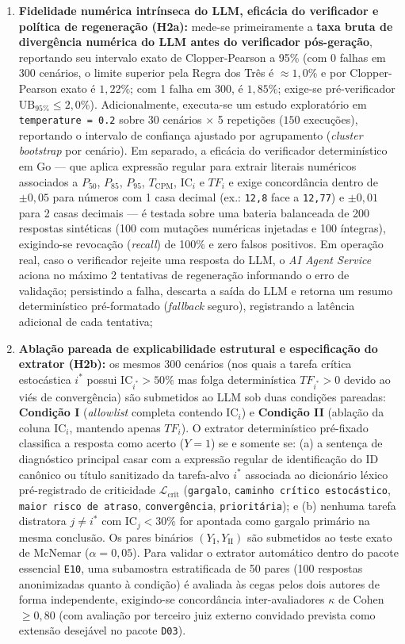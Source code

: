 \documentclass[12pt,openany,oneside,a4paper,english,brazilian,sumario=tradicional]{abntex2}
\newcommand{\IC}{\mathrm{IC}}
\begin{document}
\begin{enumerate}
  \item \textbf{Fidelidade numérica intrínseca do LLM, eficácia do verificador e política de regeneração (H2a):} mede-se primeiramente a \textbf{taxa bruta de divergência numérica do LLM antes do verificador pós-geração}, reportando seu intervalo exato de Clopper-Pearson a 95\% (com 0 falhas em 300 cenários, o limite superior pela Regra dos Três é $\approx 1{,}0\%$ e por Clopper-Pearson exato é $1{,}22\%$; com 1 falha em 300, é $1{,}85\%$; exige-se pré-verificador $\mathrm{UB}_{95\%} \le 2{,}0\%$). Adicionalmente, executa-se um estudo exploratório em \texttt{temperature = 0.2} sobre 30 cenários $\times$ 5 repetições ($150$ execuções), reportando o intervalo de confiança ajustado por agrupamento (\textit{cluster bootstrap} por cenário). Em separado, a eficácia do verificador determinístico em Go — que aplica expressão regular para extrair literais numéricos associados a $P_{50}$, $P_{85}$, $P_{95}$, $T_{\mathrm{CPM}}$, $\IC_i$ e $TF_i$ e exige concordância dentro de $\pm 0{,}05$ para números com 1 casa decimal (ex.: \texttt{12,8} face a \texttt{12,77}) e $\pm 0{,}01$ para 2 casas decimais — é testada sobre uma bateria balanceada de 200 respostas sintéticas (100 com mutações numéricas injetadas e 100 íntegras), exigindo-se revocação (\textit{recall}) de 100\% e zero falsos positivos. Em operação real, caso o verificador rejeite uma resposta do LLM, o \textit{AI Agent Service} aciona no máximo 2 tentativas de regeneração informando o erro de validação; persistindo a falha, descarta a saída do LLM e retorna um resumo determinístico pré-formatado (\textit{fallback} seguro), registrando a latência adicional de cada tentativa;
  \item \textbf{Ablação pareada de explicabilidade estrutural e especificação do extrator (H2b):} os mesmos 300 cenários (nos quais a tarefa crítica estocástica $i^*$ possui $\IC_{i^*} > 50\%$ mas folga determinística $TF_{i^*} > 0$ devido ao viés de convergência) são submetidos ao LLM sob duas condições pareadas: \textbf{Condição I} (\textit{allowlist} completa contendo $\IC_i$) e \textbf{Condição II} (ablação da coluna $\IC_i$, mantendo apenas $TF_i$). O extrator determinístico pré-fixado classifica a resposta como acerto ($Y=1$) se e somente se: (a) a sentença de diagnóstico principal casar com a expressão regular de identificação do ID canônico ou título sanitizado da tarefa-alvo $i^*$ associada ao dicionário léxico pré-registrado de criticidade $\mathcal{L}_{\text{crit}}$ (\texttt{gargalo}, \texttt{caminho crítico estocástico}, \texttt{maior risco de atraso}, \texttt{convergência}, \texttt{prioritária}); e (b) nenhuma tarefa distratora $j \ne i^*$ com $\IC_j < 30\%$ for apontada como gargalo primário na mesma conclusão. Os pares binários $(Y_{\mathrm{I}}, Y_{\mathrm{II}})$ são submetidos ao teste exato de McNemar ($\alpha=0{,}05$). Para validar o extrator automático dentro do pacote essencial \texttt{E10}, uma subamostra estratificada de 50 pares (100 respostas anonimizadas quanto à condição) é avaliada às cegas pelos dois autores de forma independente, exigindo-se concordância inter-avaliadores $\kappa$ de Cohen $\ge 0{,}80$ (com avaliação por terceiro juiz externo convidado prevista como extensão desejável no pacote \texttt{D03}).

\end{enumerate}
\end{document}
